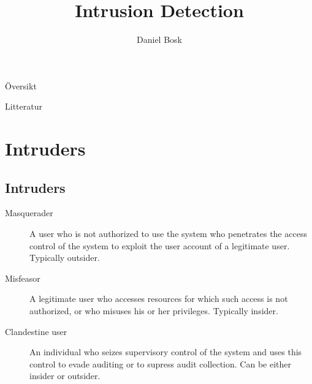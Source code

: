 \documentclass{beamer}
\title[Intrusion]{%
  Intrusion Detection
}
\author{Daniel Bosk}
\institute[MIUN ICS]{%
  Department of Information and Communication Systems (ICS),\\
  Mid Sweden University, Sundsvall.
}
\date{\svnId}
\begin{document}
\begin{frame}
  \titlepage
\end{frame}

\begin{frame}{Översikt}
	\tableofcontents
\end{frame}
\begin{frame}{Litteratur}
  
\end{frame}





\section{Intruders}

\subsection{Intruders}

\begin{frame}{\insertsubsectionhead}
  \begin{description}
    \item[Masquerader] A user who is not authorized to use the system who 
      penetrates the access control of the system to exploit the user account 
      of a legitimate user.
      Typically outsider.

    \item[Misfeasor] A legitimate user who accesses resources for which such 
      access is not authorized, or who misuses his or her privileges.
      Typically insider.

    \item[Clandestine user] An individual who seizes supervisory control of the 
      system and uses this control to evade auditing or to supress audit 
      collection.
      Can be either insider or outsider.

  \end{description}
\end{frame}
\end{document}
